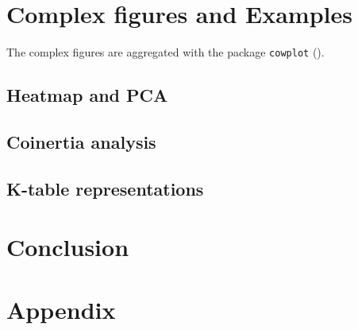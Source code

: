 \documentclass[a4paper,10pt]{article}
\begin{document}
\section{Complex figures and Examples}

The complex figures are aggregated with the package \texttt{cowplot} (\cite{cowplot}).

\subsection{Heatmap and PCA}




\subsection{Coinertia analysis}




\subsection{K-table representations}






\section{Conclusion}





\section{Appendix}
\end{document}
